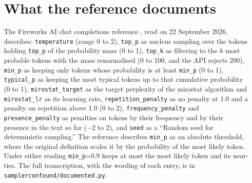\documentclass[10pt]{article}
\newcommand{\p}[1]{\texttt{#1}}
\begin{document}
\section{What the reference documents}
\label{app:docs}

The Fireworks AI chat completions reference \citep{fireworks2026reference}, read on 22 September 2026, describes: \p{temperature} (range 0 to 2), \p{top\_p} as nucleus sampling over the tokens holding \p{top\_p} of the probability mass (0 to 1), \p{top\_k} as filtering to the $k$ most probable tokens with the mass renormalised (0 to 100, and the API rejects 200), \p{min\_p} as keeping only tokens whose probability is at least \p{min\_p} (0 to 1), \p{typical\_p} as keeping the most typical tokens up to that cumulative probability (0 to 1), \p{mirostat\_target} as the target perplexity of the mirostat algorithm and \p{mirostat\_lr} as its learning rate, \p{repetition\_penalty} as no penalty at 1.0 and a penalty on repetition above 1.0 (0 to 2), \p{frequency\_penalty} and \p{presence\_penalty} as penalties on tokens by their frequency and by their presence in the text so far ($-2$ to 2), and \p{seed} as a ``Random seed for deterministic sampling.'' The reference describes \p{min\_p} as an absolute threshold, where the original definition \citep{nguyen2025minp} scales it by the probability of the most likely token. Under either reading \p{min\_p}=0.9 keeps at most the most likely token and its near-ties. The full transcription, with the wording of each entry, is in \texttt{samplerconfound/documented.py}.
\end{document}
